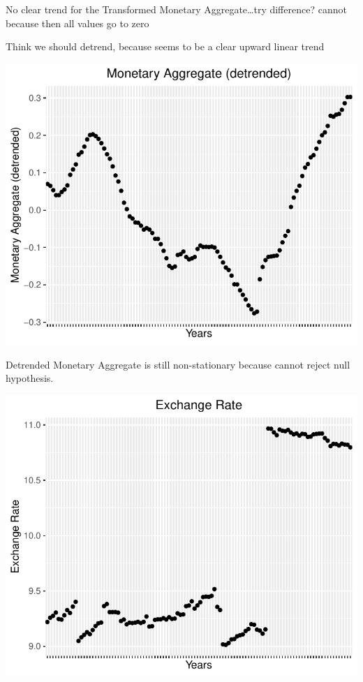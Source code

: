 \documentclass[11pt,preprint, authoryear]{elsarticle}
\numberwithin{equation}{section}
\numberwithin{figure}{section}
\numberwithin{table}{section}
\begin{document}
No clear trend for the Transformed Monetary Aggregate\ldots try
difference? cannot because then all values go to zero

Think we should detrend, because seems to be a clear upward linear trend

\begin{center}\includegraphics{README_files/figure-latex/unnamed-chunk-19-1} \end{center}

Detrended Monetary Aggregate is still non-stationary because cannot
reject null hypothesis.

\begin{center}\includegraphics{README_files/figure-latex/unnamed-chunk-20-1} \end{center}
\end{document}
